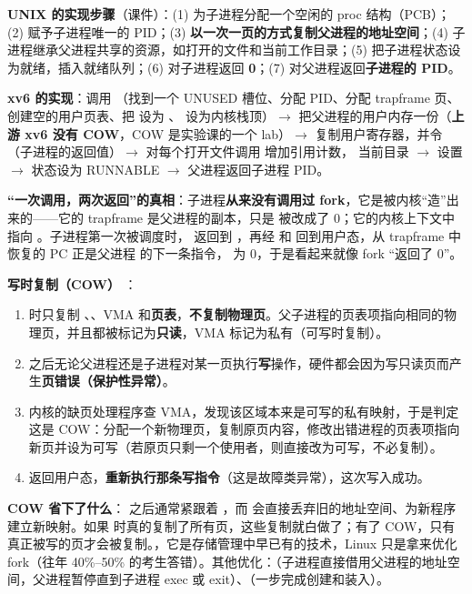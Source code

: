 \textbf{UNIX  的实现步骤}（课件）：(1) 为子进程分配一个空闲的 proc 结构（PCB）；(2) 赋予子进程唯一的 PID；(3) \textbf{以一次一页的方式复制父进程的地址空间}；(4) 子进程继承父进程共享的资源，如打开的文件和当前工作目录；(5) 把子进程状态设为就绪，插入就绪队列；(6) 对子进程返回 \textbf{0}；(7) 对父进程返回\textbf{子进程的 PID}。

\textbf{xv6  的实现}：调用 （找到一个 UNUSED 槽位、分配 PID、分配 trapframe 页、创建空的用户页表、把  设为 、 设为内核栈顶）$\to$  把父进程的用户内存一份（\textbf{上游 xv6 没有 COW}，COW 是实验课的一个 lab）$\to$  复制用户寄存器，并令 （子进程的返回值）$\to$ 对每个打开文件调用  增加引用计数， 当前目录 $\to$ 设置  $\to$ 状态设为 RUNNABLE $\to$ 父进程返回子进程 PID。

\textbf{“一次调用，两次返回”的真相}：子进程\textbf{从来没有调用过 fork}，它是被内核“造”出来的——它的 trapframe 是父进程的副本，只是  被改成了 0；它的内核上下文中  指向 。子进程第一次被调度时， 返回到 ，再经  和  回到用户态，从 trapframe 中恢复的 PC 正是父进程  的下一条指令， 为 0，于是看起来就像 fork “返回了 0”。

\textbf{写时复制（COW）} \bk：
\begin{enumerate}
    \item {} 时只复制 、、VMA 和\textbf{页表}，\textbf{不复制物理页}。父子进程的页表项指向相同的物理页，并且都被标记为\textbf{只读}，VMA 标记为私有（可写时复制）。
    \item 之后无论父进程还是子进程对某一页执行\textbf{写}操作，硬件都会因为写只读页而产生\textbf{页错误（保护性异常）}。
    \item 内核的缺页处理程序查 VMA，发现该区域本来是可写的私有映射，于是判定这是 COW：分配一个新物理页，复制原页内容，修改出错进程的页表项指向新页并设为可写（若原页只剩一个使用者，则直接改为可写，不必复制）。
    \item 返回用户态，\textbf{重新执行那条写指令}（这是故障类异常），这次写入成功。
\end{enumerate}
\textbf{COW 省下了什么}： 之后通常紧跟着 ，而  会直接丢弃旧的地址空间、为新程序建立新映射。如果  时真的复制了所有页，这些复制就白做了；有了 COW，只有真正被写的页才会被复制。\ez {}，它是存储管理中早已有的技术，Linux 只是拿来优化 fork（往年 40\%–50\% 的考生答错）。其他优化：（子进程直接借用父进程的地址空间，父进程暂停直到子进程 exec 或 exit）、（一步完成创建和装入）。

